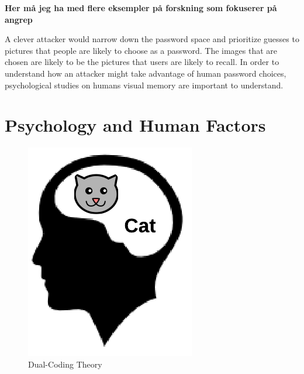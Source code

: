   {\bf \color{red} Her må jeg ha med flere eksempler på forskning som fokuserer på angrep}

  A clever attacker would narrow down the password space and prioritize guesses to pictures that people are likely to choose as a password. The images that are chosen are likely to be the pictures that users are likely to recall. 
  In order to understand how an attacker might take advantage of human password choices, psychological studies on humans visual memory are important to understand. 

\section{Psychology and Human Factors}

  \begin{figure}
    \vspace{-20pt}
    \begin{center}
      \includegraphics[scale=0.35]{pics/dualCoding.png}
    \end{center}
    \vspace{-20pt}
    \caption{Dual-Coding Theory}
    \vspace{-10pt}
  \end{figure}

